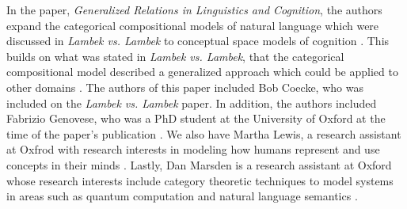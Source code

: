 \documentclass[11pt, reqno]{amsart}
\theoremstyle{plain}
\theoremstyle{definition}
\theoremstyle{example}
\begin{document}
\par
In the paper, \textit{Generalized Relations in Linguistics and Cognition}, the authors expand the categorical compositional models of natural language which were discussed in \textit{Lambek vs. Lambek} to conceptual space models of cognition \cite{relations}. This builds on what was stated in \textit{Lambek vs. Lambek}, that the categorical compositional model described a generalized approach which could be applied to other domains \cite{lambekvlambek}. The authors of this paper included Bob Coecke, who was included on the \textit{Lambek vs. Lambek} paper. In addition, the authors included Fabrizio Genovese, who was a PhD student at the University of Oxford at the time of the paper's publication \cite{genovese}. We also have Martha Lewis, a research assistant at Oxfrod with research interests in modeling how humans represent and use concepts in their minds \cite{lewis}. Lastly, Dan Marsden is a research assistant at Oxford whose research interests include category theoretic techniques to model systems in areas such as quantum computation and natural language semantics \cite{marsden}.
\newpage
\end{document}
